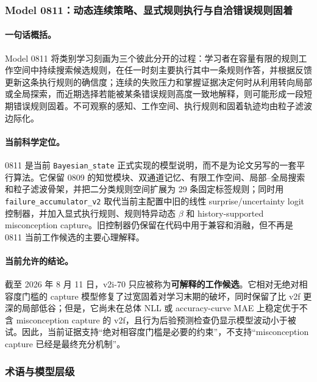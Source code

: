 
\subsubsection{Model 0811：动态连续策略、显式规则执行与自洽错误规则固着}

\paragraph{一句话概括。}
Model 0811 将类别学习刻画为三个彼此分开的过程：学习者在容量有限的规则工作空间中持续搜索候选规则，在任一时刻主要执行其中一条规则作答，并根据反馈更新这条执行规则的确信度；连续的失败压力和掌握证据决定何时从利用转向局部或全局探索，而近期选择若能被某条错误规则高度一致地解释，则可能形成一段短期错误规则固着。不可观察的感知、工作空间、执行规则和固着轨迹均由粒子滤波边际化。

\paragraph{当前科学定位。}
0811 是当前 \texttt{Bayesian\_state} 正式实现的模型说明，而不是为论文另写的一套平行算法。它保留 0809 的知觉模块、双通道记忆、有限工作空间、局部--全局搜索和粒子滤波骨架，并把二分类规则空间扩展为 29 条固定标签规则；同时用
\texttt{failure\_accumulator\_v2} 取代当前主配置中旧的线性 surprise/uncertainty logit 控制器，并加入显式执行规则、规则特异动态 $\beta$ 和 history-supported misconception capture。旧控制器仍保留在代码中用于兼容和消融，但不再是 0811 当前工作候选的主要心理解释。

\paragraph{当前允许的结论。}
截至 2026 年 8 月 11 日，v2i-70 只应被称为\textbf{可解释的工作候选}。它相对无绝对相容度门槛的 capture 模型修复了过宽固着对学习末期的破坏，同时保留了比 v2f 更深的局部低谷；但是，它尚未在总体 NLL 或 accuracy-curve MAE 上稳定优于不含 misconception capture 的 v2f，且行为后验预测检查仍显示模型波动小于被试。因此，当前证据支持“绝对相容度门槛是必要的约束”，不支持“misconception capture 已经是最终充分机制”。


\subsubsection{术语与模型层级}

